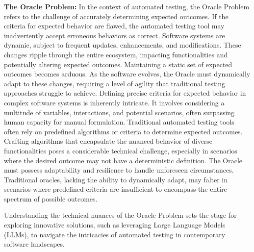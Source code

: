 \textbf{The Oracle Problem:}
In the context of automated testing, the Oracle Problem refers to the challenge of accurately determining expected outcomes. If the criteria for expected behavior are flawed, the automated testing tool may inadvertently accept erroneous behaviors as correct. 
Software systems are dynamic, subject to frequent updates, enhancements, and modifications. These changes ripple through the entire ecosystem, impacting functionalities and potentially altering expected outcomes. Maintaining a static set of expected outcomes becomes arduous. As the software evolves, the Oracle must dynamically adapt to these changes, requiring a level of agility that traditional testing approaches struggle to achieve. Defining precise criteria for expected behavior in complex software systems is inherently intricate. It involves considering a multitude of variables, interactions, and potential scenarios, often surpassing human capacity for manual formulation. Traditional automated testing tools often rely on predefined algorithms or criteria to determine expected outcomes. Crafting algorithms that encapsulate the nuanced behavior of diverse functionalities poses a considerable technical challenge, especially in scenarios where the desired outcome may not have a deterministic definition. The Oracle must possess adaptability and resilience to handle unforeseen circumstances. Traditional oracles, lacking the ability to dynamically adapt, may falter in scenarios where predefined criteria are insufficient to encompass the entire spectrum of possible outcomes.

Understanding the technical nuances of the Oracle Problem sets the stage for exploring innovative solutions, such as leveraging Large Language Models (LLMs), to navigate the intricacies of automated testing in contemporary software landscapes.